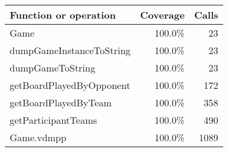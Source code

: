 \bigskip
\begin{longtable}{|l|r|r|}
\hline
Function or operation & Coverage & Calls \\
\hline
\hline
Game & 100.0\% & 23 \\
\hline
dumpGameInstanceToString & 100.0\% & 23 \\
\hline
dumpGameToString & 100.0\% & 23 \\
\hline
getBoardPlayedByOpponent & 100.0\% & 172 \\
\hline
getBoardPlayedByTeam & 100.0\% & 358 \\
\hline
getParticipantTeams & 100.0\% & 490 \\
\hline
\hline
Game.vdmpp & 100.0\% & 1089 \\
\hline
\end{longtable}

